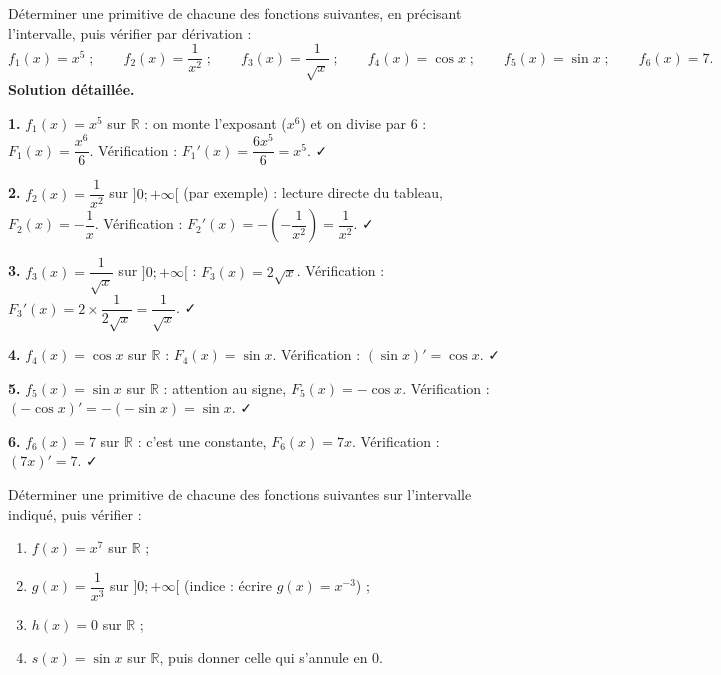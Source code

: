 \documentclass[11pt]{article}
\begin{document}
\begin{exoresolu}
Déterminer une primitive de chacune des fonctions suivantes, en précisant l'intervalle, puis vérifier par dérivation :
\[ f_1(x) = x^5 \;;\qquad f_2(x) = \frac{1}{x^2} \;;\qquad f_3(x) = \frac{1}{\sqrt{x}} \;;\qquad f_4(x) = \cos x \;;\qquad f_5(x) = \sin x \;;\qquad f_6(x) = 7. \]
\tcblower
\textbf{Solution détaillée.}

\textbf{1.} $f_1(x) = x^5$ sur $\mathbb{R}$ : on monte l'exposant ($x^6$) et on divise par 6 : $F_1(x) = \dfrac{x^6}{6}$. Vérification : $F_1'(x) = \dfrac{6x^5}{6} = x^5$. ✓

\textbf{2.} $f_2(x) = \dfrac{1}{x^2}$ sur $]0;+\infty[$ (par exemple) : lecture directe du tableau, $F_2(x) = -\dfrac{1}{x}$. Vérification : $F_2'(x) = -\left(-\dfrac{1}{x^2}\right) = \dfrac{1}{x^2}$. ✓

\textbf{3.} $f_3(x) = \dfrac{1}{\sqrt{x}}$ sur $]0;+\infty[$ : $F_3(x) = 2\sqrt{x}$. Vérification : $F_3'(x) = 2 \times \dfrac{1}{2\sqrt{x}} = \dfrac{1}{\sqrt{x}}$. ✓

\textbf{4.} $f_4(x) = \cos x$ sur $\mathbb{R}$ : $F_4(x) = \sin x$. Vérification : $(\sin x)' = \cos x$. ✓

\textbf{5.} $f_5(x) = \sin x$ sur $\mathbb{R}$ : attention au signe, $F_5(x) = -\cos x$. Vérification : $(-\cos x)' = -(-\sin x) = \sin x$. ✓

\textbf{6.} $f_6(x) = 7$ sur $\mathbb{R}$ : c'est une constante, $F_6(x) = 7x$. Vérification : $(7x)' = 7$. ✓
\end{exoresolu}

\begin{exercice}
Déterminer une primitive de chacune des fonctions suivantes sur l'intervalle indiqué, puis vérifier :
\begin{enumerate}
\item $f(x) = x^7$ sur $\mathbb{R}$ ;
\item $g(x) = \dfrac{1}{x^3}$ sur $]0;+\infty[$ (indice : écrire $g(x) = x^{-3}$) ;
\item $h(x) = 0$ sur $\mathbb{R}$ ;
\item $s(x) = \sin x$ sur $\mathbb{R}$, puis donner celle qui s'annule en $0$.
\end{enumerate}
\end{exercice}
\end{document}
